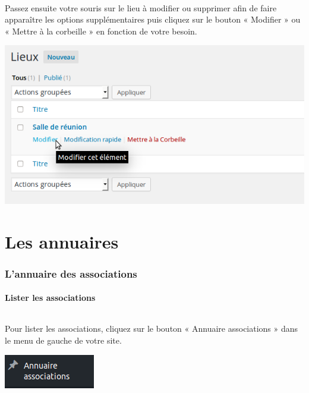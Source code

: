 \documentclass[10pt,a4paper]{article}
\begin{document}
\paragraph{}Passez ensuite votre souris sur le lieu à modifier ou supprimer afin de faire apparaître les options supplémentaires puis cliquez sur le bouton « Modifier » ou « Mettre à la corbeille » en fonction de votre besoin.
\begin{center}
\includegraphics[scale=0.3]{img/0203.png}
\end{center}
\newpage

\part{Les annuaires}
\newpage
\section{L'annuaire des associations}
\subsection{Lister les associations}
\paragraph{}Pour lister les associations, cliquez sur le bouton « Annuaire associations » dans le menu de gauche de votre site.
\begin{center}
\includegraphics[scale=0.3]{img/0298.png}
\end{center}
\end{document}
